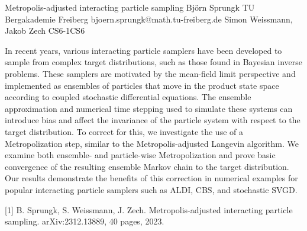 \begin{talk}
  {Metropolis-adjusted interacting particle sampling}%
  {Bj\"orn Sprungk}%
  {TU Bergakademie Freiberg}%
  {bjoern.sprungk@math.tu-freiberg.de}%
  {Simon Weissmann, Jakob Zech}%
{}{}{CS6-1}{CS6}


In recent years, various interacting particle samplers have been developed to sample from complex target distributions, such as those found in Bayesian inverse problems. These samplers are motivated by the mean-field limit perspective and implemented as ensembles of particles that move in the product state space according to coupled stochastic differential equations. The ensemble approximation and numerical time stepping used to simulate these systems can introduce bias and affect the invariance of the particle system with respect to the target distribution. To correct for this, we investigate the use of a Metropolization step, similar to the Metropolis-adjusted Langevin algorithm. We examine both ensemble- and particle-wise Metropolization and prove basic convergence of the resulting ensemble Markov chain to the target distribution. Our results demonstrate the benefits of this correction in numerical examples for popular interacting particle samplers such as ALDI, CBS, and stochastic SVGD.				
				
\medskip

[1] B. Sprungk, S. Weissmann, J. Zech. Metropolis-adjusted interacting particle sampling. arXiv:2312.13889, 40 pages, 2023.
\end{talk}

